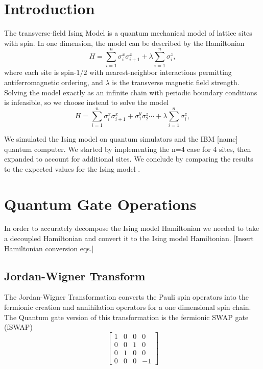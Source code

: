 \documentclass[acmtog]{acmart}
\begin{document}
\section{Introduction}
The transverse-field Ising Model is a quantum mechanical model of lattice sites with spin. In one dimension, the model can be described by the Hamiltonian
\begin{equation}
  H = \sum_{i = 1}^{n} \sigma_{i}^{x} \sigma_{i + 1}^{x}
      + \lambda \sum_{i = 1}^{n} \sigma_{i}^{z},
\end{equation}
where each site is spin-\( 1 / 2 \) with nearest-neighbor interactions permitting antiferromagnetic ordering, and \( \lambda \) is the transverse magnetic field strength. Solving the model exactly as an infinite chain with periodic boundary conditions is infeasible, so we choose instead to solve the model
\begin{equation}
  H = \sum_{i = 1}^{n} \sigma_{i}^{x} \sigma_{i + 1}^{x}
      + \sigma_{1}^{y} \sigma_{2}^{z} \dotsb
      + \lambda \sum_{i = 1}^{n} \sigma_{i}^{z},
\end{equation}


We simulated the Ising model on quantum simulators and the IBM [name] quantum computer. We started by implementing the n=4 case for 4 sites, then expanded to account for additional sites. We conclude by comparing the results to the expected values for the Ising model \cite{Cervera18}.

\section{Quantum Gate Operations}
In order to accurately decompose the Ising model Hamiltonian we needed to take a decoupled Hamiltonian and convert it to the Ising model Hamiltonian. [Insert Hamiltonian conversion eqs.]

\subsection{Jordan-Wigner Transform}
The Jordan-Wigner Transformation converts the Pauli spin operators into the fermionic creation and annihilation operators for a one dimensional spin chain. The Quantum gate version of this transformation is the fermionic SWAP gate (fSWAP) \cite{Cervera18}
\begin{equation}
    \begin{bmatrix}
        1 & 0 & 0 & 0 \\
        0 & 0 & 1 & 0 \\
        0 & 1 & 0 & 0 \\
        0 & 0 & 0 & -1
    \end{bmatrix}
\end{equation}
\end{document}
